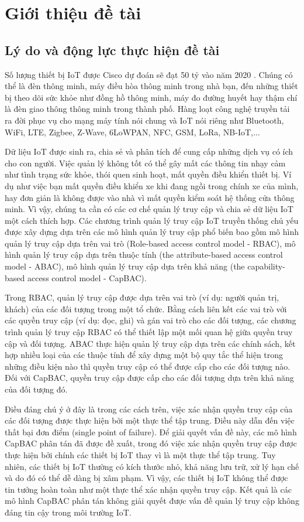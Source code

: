 \chapter{Giới thiệu đề tài}\label{chapter:introduction}
\pagestyle{fancy}
\section{Lý do và động lực thực hiện đề tài}
Số lượng thiết bị IoT được Cisco dự đoán sẽ đạt 50 tỷ vào năm 2020 \cite{fiftydevices}. Chúng có thể là đèn thông minh, máy điều hòa thông minh trong nhà bạn, đến những thiết bị theo dõi sức khỏe như đồng hồ thông minh, máy đo đường huyết hay thậm chí là đèn giao thông thông minh trong thành phố. Hàng loạt công nghệ truyền tải ra đời phục vụ cho mạng máy tính nói chung và IoT nói riêng như Bluetooth, WiFi, LTE, Zigbee, Z-Wave, 6LoWPAN, NFC, GSM, LoRa, NB-IoT,...\par
Dữ liệu IoT được sinh ra, chia sẻ và phân tích để cung cấp những dịch vụ có ích cho con người. Việc quản lý không tốt có thể gây mất các thông tin nhạy cảm như tình trạng sức khỏe, thói quen sinh hoạt, mất quyền điều khiển thiết bị. Ví dụ như việc bạn mất quyền điều khiển xe khi đang ngồi trong chính xe của mình, hay đơn giản là không được vào nhà vì mất quyền kiểm soát hệ thống cửa thông minh. Vì vậy, chúng ta cần có các cơ chế quản lý truy cập và chia sẻ dữ liệu IoT một cách thích hợp. Các chương trình quản lý truy cập IoT truyền thống chủ yếu được xây dựng dựa trên các mô hình quản lý truy cập phổ biến bao gồm mô hình quản lý truy cập dựa trên vai trò (Role-based access control model - RBAC), mô hình quản lý truy cập dựa trên thuộc tính (the attribute-based access control model - ABAC), mô hình quản lý truy cập dựa trên khả năng (the capability-based access control model - CapBAC).\par
Trong RBAC, quản lý truy cập được dựa trên vai trò (ví dụ: người quản trị, khách) của các đối tượng trong một tổ chức. Bằng cách liên kết các vai trò với các quyền truy cập (ví dụ: đọc, ghi) và gán vai trò cho các đối tượng, các chương trình quản lý truy cập RBAC có thể thiết lập một mối quan hệ giữa quyền truy cập và đối tượng. ABAC thực hiện quản lý truy cập dựa trên các chính sách, kết hợp nhiều loại của các thuộc tính để xây dựng một bộ quy tắc thể hiện trong những điều kiện nào thì quyền truy cập có thể được cấp cho các đối tượng nào. Đối với CapBAC, quyền truy cập được cấp cho các đối tượng dựa trên khả năng của đối tượng đó.\par
Điều đáng chú ý ở đây là trong các cách trên, việc xác nhận quyền truy cập của các đối tượng được thực hiện bởi một thực thể tập trung. Điều này dẫn đến việc thất bại đơn điểm (single point of failure). Để giải quyết vấn đề này, các mô hình CapBAC phân tán đã được đề xuất, trong đó việc xác nhận quyền truy cập được thực hiện bởi chính các thiết bị IoT thay vì là một thực thể tập trung. Tuy nhiên, các thiết bị IoT thường có kích thước nhỏ, khả năng lưu trữ, xử lý hạn chế  và do đó có thể dễ dàng bị xâm phạm. Vì vậy, các thiết bị IoT không thể được tin tưởng hoàn toàn như một thực thể xác nhận quyền truy cập. Kết quả là các mô hình CapBAC phân tán không giải quyết được vấn đề quản lý truy cập không đáng tin cậy trong môi trường IoT. \par
